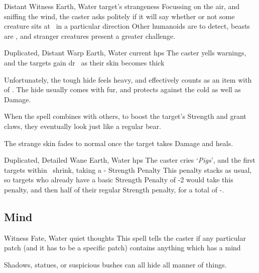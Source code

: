 \begin{multicols}{2}
{  

    {Distant}%
    {Witness}%
    {Earth, Water}%
    {target's strangeness}%
    {Focussing on the air, and sniffing the wind, the caster asks politely if it will say whether or not some creature sits at \spellRange\ in a particular direction}%
    {Other humanoids are \tn[7] to detect, beasts are \tn[9], and stranger creatures present a greater challenge.}


    {Duplicated, Distant}%
    {Warp}%
    {Earth, Water}%
    {current \glspl{hp}}%
    {The caster yells warnings, and the targets gain \gls{dr}~ as their skin becomes thick}%
    {Unfortunately, the tough hide feels heavy, and effectively counts as an item with  of .
    The hide usually comes with fur, and protects against the cold as well as Damage.

    When the spell combines with others, to boost the target's Strength and grant claws, they eventually look just like a regular bear.

    The strange skin fades to normal once the target takes Damage and heals.}

    {Duplicated, Detailed}%
    {Wane}%
    {Earth, Water}%
    {\glspl{hp}}%
    {The caster cries `\textit{Pigs}', and the first  targets within \spellRange\ shrink, taking a - Strength Penalty}%
    {
    This penalty stacks as usual, so targets who already have a basic Strength Penalty of -2 would take this penalty, and then half of their regular Strength penalty, for a total of -.}

}{}

\subsection{Mind}
\label{mindSpells}



  {}%
  {Witness}%
  {Fate, Water}%
  {quiet thoughts}%
  {This spell tells the caster if any particular patch (and it has to be a specific patch) contains anything which has a mind}%
  {Shadows, statues, or suspicious bushes can all hide all manner of things.

}
\end{multicols}

